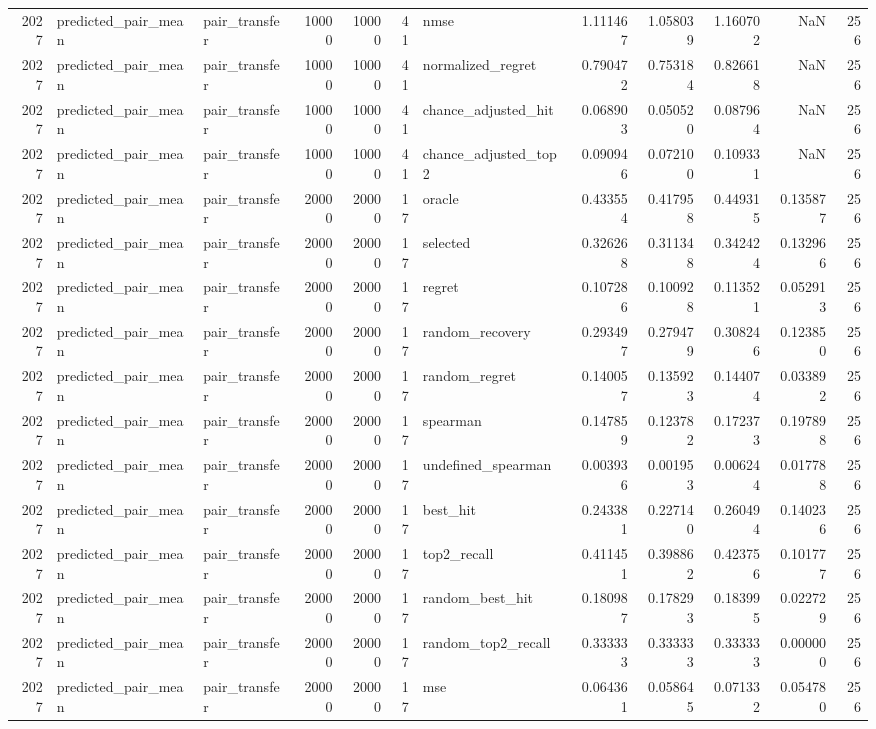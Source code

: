 \begin{tabular}{rllrrrlrrrrr}
2027 & predicted_pair_mean & pair_transfer & 10000 & 10000 & 41 & nmse & 1.111467 & 1.058039 & 1.160702 & NaN & 256 \\
2027 & predicted_pair_mean & pair_transfer & 10000 & 10000 & 41 & normalized_regret & 0.790472 & 0.753184 & 0.826618 & NaN & 256 \\
2027 & predicted_pair_mean & pair_transfer & 10000 & 10000 & 41 & chance_adjusted_hit & 0.068903 & 0.050520 & 0.087964 & NaN & 256 \\
2027 & predicted_pair_mean & pair_transfer & 10000 & 10000 & 41 & chance_adjusted_top2 & 0.090946 & 0.072100 & 0.109331 & NaN & 256 \\
2027 & predicted_pair_mean & pair_transfer & 20000 & 20000 & 17 & oracle & 0.433554 & 0.417958 & 0.449315 & 0.135877 & 256 \\
2027 & predicted_pair_mean & pair_transfer & 20000 & 20000 & 17 & selected & 0.326268 & 0.311348 & 0.342424 & 0.132966 & 256 \\
2027 & predicted_pair_mean & pair_transfer & 20000 & 20000 & 17 & regret & 0.107286 & 0.100928 & 0.113521 & 0.052913 & 256 \\
2027 & predicted_pair_mean & pair_transfer & 20000 & 20000 & 17 & random_recovery & 0.293497 & 0.279479 & 0.308246 & 0.123850 & 256 \\
2027 & predicted_pair_mean & pair_transfer & 20000 & 20000 & 17 & random_regret & 0.140057 & 0.135923 & 0.144074 & 0.033892 & 256 \\
2027 & predicted_pair_mean & pair_transfer & 20000 & 20000 & 17 & spearman & 0.147859 & 0.123782 & 0.172373 & 0.197898 & 256 \\
2027 & predicted_pair_mean & pair_transfer & 20000 & 20000 & 17 & undefined_spearman & 0.003936 & 0.001953 & 0.006244 & 0.017788 & 256 \\
2027 & predicted_pair_mean & pair_transfer & 20000 & 20000 & 17 & best_hit & 0.243381 & 0.227140 & 0.260494 & 0.140236 & 256 \\
2027 & predicted_pair_mean & pair_transfer & 20000 & 20000 & 17 & top2_recall & 0.411451 & 0.398862 & 0.423756 & 0.101777 & 256 \\
2027 & predicted_pair_mean & pair_transfer & 20000 & 20000 & 17 & random_best_hit & 0.180987 & 0.178293 & 0.183995 & 0.022729 & 256 \\
2027 & predicted_pair_mean & pair_transfer & 20000 & 20000 & 17 & random_top2_recall & 0.333333 & 0.333333 & 0.333333 & 0.000000 & 256 \\
2027 & predicted_pair_mean & pair_transfer & 20000 & 20000 & 17 & mse & 0.064361 & 0.058645 & 0.071332 & 0.054780 & 256 \\

\end{tabular}
